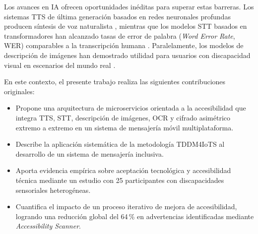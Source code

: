 \documentclass[journal]{IEEEtran}
\begin{document}
		Los avances en IA ofrecen oportunidades in\'editas para superar estas barreras. Los sistemas TTS de \'ultima generaci\'on basados en redes neuronales profundas producen s\'intesis de voz naturalista \cite{tan2021}, mientras que los modelos STT basados en transformadores han alcanzado tasas de error de palabra (\textit{Word Error Rate}, WER) comparables a la transcripci\'on humana \cite{baevski2020}. Paralelamente, los modelos de descripci\'on de im\'agenes han demostrado utilidad para usuarios con discapacidad visual en escenarios del mundo real \cite{dognin2021}.
		
		En este contexto, el presente trabajo realiza las siguientes contribuciones originales:
		
		\begin{itemize}
		    \item Propone una arquitectura de microservicios orientada a la accesibilidad que integra TTS, STT, descripci\'on de im\'agenes, OCR y cifrado asim\'etrico extremo a extremo en un sistema de mensajer\'ia m\'ovil multiplataforma.
		    \item Describe la aplicaci\'on sistemática de la metodolog\'ia TDDM4IoTS \cite{guerrero2020} al desarrollo de un sistema de mensajer\'ia inclusiva.
		    \item Aporta evidencia emp\'irica sobre aceptaci\'on tecnol\'ogica y accesibilidad t\'ecnica mediante un estudio con 25 participantes con discapacidades sensoriales heterog\'eneas.
		    \item Cuantifica el impacto de un proceso iterativo de mejora de accesibilidad, logrando una reducci\'on global del 64\,\% en advertencias identificadas mediante \textit{Accessibility Scanner}.
		\end{itemize}
		
\end{document}
